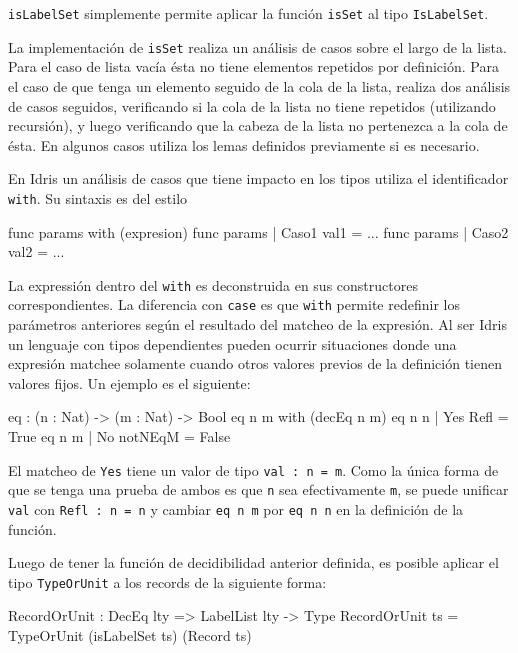 \begin{code}
\begin{code}
{\texttt{isLabelSet} simplemente permite aplicar la función \texttt{isSet} al tipo \texttt{IsLabelSet}.

La implementación de \texttt{isSet} realiza un análisis de casos sobre el largo de la lista. Para el caso de lista vacía ésta no tiene elementos repetidos por definición. Para el caso de que tenga un elemento seguido de la cola de la lista, realiza dos análisis de casos seguidos, verificando si la cola de la lista no tiene repetidos (utilizando recursión), y luego verificando que la cabeza de la lista no pertenezca a la cola de ésta. En algunos casos utiliza los lemas definidos previamente si es necesario.

En Idris un análisis de casos que tiene impacto en los tipos utiliza el identificador \texttt{with}. Su sintaxis es del estilo

\begin{code}
func params with (expresion)
  func params | Caso1 val1 = ...
  func params | Caso2 val2 = ...
\end{code}

La expressión dentro del \texttt{with} es deconstruida en sus constructores correspondientes. La diferencia con \texttt{case} es que \texttt{with} permite redefinir los parámetros anteriores según el resultado del matcheo de la expresión. Al ser Idris un lenguaje con tipos dependientes pueden ocurrir situaciones donde una expresión matchee solamente cuando otros valores previos de la definición tienen valores fijos. Un ejemplo es el siguiente:

\begin{code}
eq : (n : Nat) -> (m : Nat) -> Bool  
eq n m  with (decEq n m)
  eq n n | Yes Refl = True
  eq n m | No notNEqM = False
\end{code}

El matcheo de \texttt{Yes} tiene un valor de tipo \texttt{val : n = m}. Como la única forma de que se tenga una prueba de ambos es que \texttt{n} sea efectivamente \texttt{m}, se puede unificar \texttt{val} con \texttt{Refl : n = n} y cambiar \texttt{eq n m} por \texttt{eq n n} en la definición de la función.


Luego de tener la función de decidibilidad anterior definida, es posible aplicar el tipo \texttt{TypeOrUnit} a los records de la siguiente forma:

\begin{code}
RecordOrUnit : DecEq lty => LabelList lty -> Type
RecordOrUnit ts = TypeOrUnit (isLabelSet ts) (Record ts)
\end{code}

}
\end{code}
\end{code}
